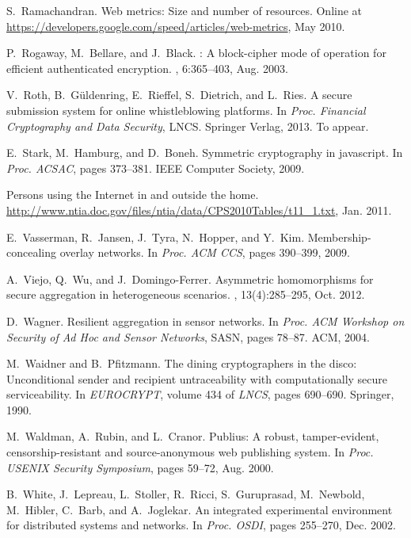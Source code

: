 \documentclass[twocolumn,10pt]{article}
\begin{document}
\begin{thebibliography}{10}
S.~Ramachandran.
\newblock Web metrics: Size and number of resources.
\newblock Online at
  \url{https://developers.google.com/speed/articles/web-metrics}, May 2010.

P.~Rogaway, M.~Bellare, and J.~Black.
: A block-cipher mode of operation for efficient authenticated
  encryption.
, 6:365--403, Aug. 2003.

V.~Roth, B.~G\"uldenring, E.~Rieffel, S.~Dietrich, and L.~Ries.
\newblock A secure submission system for online whistleblowing platforms.
\newblock In {\em Proc. Financial Cryptography and Data Security}, LNCS.
  Springer Verlag, 2013.
\newblock To appear.

E.~Stark, M.~Hamburg, and D.~Boneh.
\newblock Symmetric cryptography in javascript.
\newblock In {\em Proc. ACSAC}, pages 373--381. IEEE Computer Society, 2009.

{Persons using the {Internet} in and outside the home}.
\newblock
  \url{http://www.ntia.doc.gov/files/ntia/data/CPS2010Tables/t11_1.txt}, Jan.
  2011.

E.~Vasserman, R.~Jansen, J.~Tyra, N.~Hopper, and Y.~Kim.
\newblock Membership-concealing overlay networks.
\newblock In {\em Proc. ACM CCS}, pages 390--399, 2009.

A.~Viejo, Q.~Wu, and J.~Domingo-Ferrer.
\newblock Asymmetric homomorphisms for secure aggregation in heterogeneous
  scenarios.
, 13(4):285--295, Oct. 2012.

D.~Wagner.
\newblock Resilient aggregation in sensor networks.
\newblock In {\em Proc. ACM Workshop on Security of Ad Hoc and Sensor
  Networks}, SASN, pages 78--87. ACM, 2004.

M.~Waidner and B.~Pfitzmann.
\newblock The dining cryptographers in the disco: Unconditional sender and
  recipient untraceability with computationally secure serviceability.
\newblock In {\em EUROCRYPT}, volume 434 of {\em LNCS}, pages 690--690.
  Springer, 1990.

M.~Waldman, A.~Rubin, and L.~Cranor.
\newblock Publius: {A} robust, tamper-evident, censorship-resistant and
  source-anonymous web publishing system.
\newblock In {\em Proc. USENIX Security Symposium}, pages 59--72, Aug. 2000.

B.~White, J.~Lepreau, L.~Stoller, R.~Ricci, S.~Guruprasad, M.~Newbold,
  M.~Hibler, C.~Barb, and A.~Joglekar.
\newblock An integrated experimental environment for distributed systems and
  networks.
\newblock In {\em Proc. OSDI}, pages 255--270, Dec. 2002.


\end{thebibliography}
\end{document}
